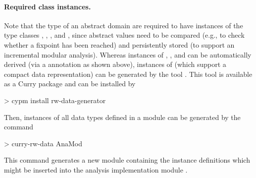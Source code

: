 \paragraph{Required class instances.}
Note that the type of an abstract domain are required to have
instances of the type classes , , ,
and , since abstract values need to be compared
(e.g., to check whether a fixpoint has been reached)
and persistently stored (to support an incremental modular analysis).
Whereas instances of , , and 
can be automatically derived (via a  annotation
as shown above),
instances of  (which support a compact data representation)
can be generated by the tool .
This tool is available as a Curry package and can be installed by
%
\begin{curry}
> cypm install rw-data-generator
\end{curry}
%
Then,  instances of all data types defined
in a module  can be generated by the command
%
\begin{curry}
> curry-rw-data AnaMod
\end{curry}
%
This command generates a new module  containing
the instance definitions which might be inserted into
the analysis implementation module .

